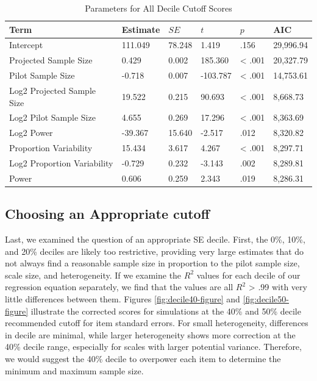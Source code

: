 \documentclass[
  man]{apa7}
\begin{document}
\begin{table}[tbp]

\begin{center}
\begin{threeparttable}

\caption{\label{tab:table-correction}Parameters for All Decile Cutoff Scores}

\begin{tabular}{llllll}
\toprule
Term & Estimate & $SE$ & $t$ & $p$ & AIC\\
\midrule
Intercept & 111.049 & 78.248 & 1.419 & .156 & 29,996.94\\
Projected Sample Size & 0.429 & 0.002 & 185.360 & < .001 & 20,327.79\\
Pilot Sample Size & -0.718 & 0.007 & -103.787 & < .001 & 14,753.61\\
Log2 Projected Sample Size & 19.522 & 0.215 & 90.693 & < .001 & 8,668.73\\
Log2 Pilot Sample Size & 4.655 & 0.269 & 17.296 & < .001 & 8,363.69\\
Log2 Power & -39.367 & 15.640 & -2.517 & .012 & 8,320.82\\
Proportion Variability & 15.434 & 3.617 & 4.267 & < .001 & 8,297.71\\
Log2 Proportion Variability & -0.729 & 0.232 & -3.143 & .002 & 8,289.81\\
Power & 0.606 & 0.259 & 2.343 & .019 & 8,286.31\\
\bottomrule
\end{tabular}

\end{threeparttable}
\end{center}

\end{table}

\hypertarget{choosing-an-appropriate-cutoff}{%
\subsection{Choosing an Appropriate cutoff}\label{choosing-an-appropriate-cutoff}}

Last, we examined the question of an appropriate SE decile. First, the 0\%, 10\%, and 20\% deciles are likely too restrictive, providing very large estimates that do not always find a reasonable sample size in proportion to the pilot sample size, scale size, and heterogeneity. If we examine the \(R^2\) values for each decile of our regression equation separately, we find that the values are all \(R^2\) \textgreater{} .99 with very little differences between them. Figures \ref{fig:decile40-figure} and \ref{fig:decile50-figure} illustrate the corrected scores for simulations at the 40\% and 50\% decile recommended cutoff for item standard errors. For small heterogeneity, differences in decile are minimal, while larger heterogeneity shows more correction at the 40\% decile range, especially for scales with larger potential variance. Therefore, we would suggest the 40\% decile to overpower each item to determine the minimum and maximum sample size.
\end{document}
